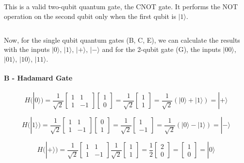 \documentclass[12pt]{article}
\begin{document}
This is a valid two-qubit quantum gate, the CNOT gate. It performs the NOT operation on the second qubit only when the first qubit is $|1⟩$.

\subsection*{}

Now, for the single qubit quantum gates (B, C, E), we can calculate the results with the inputs $|0⟩$, $|1⟩$, $|+⟩$, $|-⟩$ and for the 2-qubit gate (G), the inputs $|00⟩$, $|01⟩$, $|10⟩$, $|11⟩$. 

\paragraph*{B - Hadamard Gate}

$$ H(|0⟩) = \frac{1}{\sqrt{2}} \begin{bmatrix} 1 & 1 \\ 1 & -1 \end{bmatrix} \begin{bmatrix} 1 \\ 0 \end{bmatrix} = \frac{1}{\sqrt{2}} \begin{bmatrix} 1 \\ 1 \end{bmatrix} = \frac{1}{\sqrt{2}} (|0⟩ + |1⟩) = |+⟩ $$

$$ H(|1⟩) = \frac{1}{\sqrt{2}} \begin{bmatrix} 1 & 1 \\ 1 & -1 \end{bmatrix} \begin{bmatrix} 0 \\ 1 \end{bmatrix} = \frac{1}{\sqrt{2}} \begin{bmatrix} 1 \\ -1 \end{bmatrix} = \frac{1}{\sqrt{2}} (|0⟩ - |1⟩) = |-⟩ $$

$$ H(|+⟩) = \frac{1}{\sqrt{2}} \begin{bmatrix} 1 & 1 \\ 1 & -1 \end{bmatrix} \frac{1}{\sqrt{2}} \begin{bmatrix} 1 \\ 1 \end{bmatrix} = \frac{1}{2} \begin{bmatrix} 2 \\ 0 \end{bmatrix} = \begin{bmatrix} 1 \\ 0 \end{bmatrix} = |0⟩ $$
\end{document}
